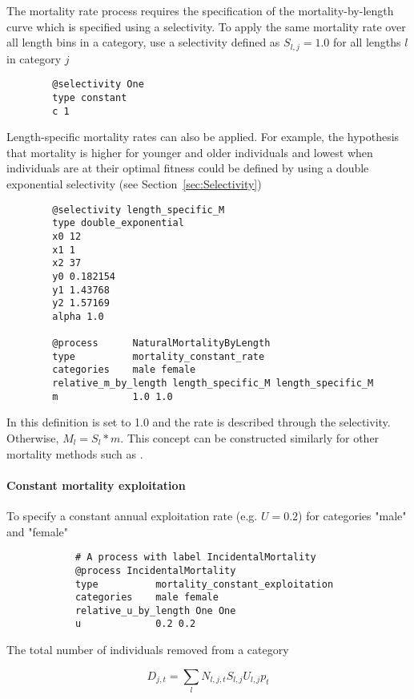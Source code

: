 The mortality rate process requires the specification of the mortality-by-length curve which is specified using a selectivity. To apply the same mortality rate over all length bins in a category, use a selectivity defined as $S_{l,j}=1.0$ for all lengths $l$ in category $j$

{\small{\begin{verbatim}
		@selectivity One
		type constant
		c 1
		\end{verbatim}}}

Length-specific mortality rates can also be applied. For example, the hypothesis that mortality is higher for younger and older individuals and lowest when individuals are at their optimal fitness could be defined by using a double exponential selectivity (see Section~\ref{sec:Selectivity})

{\small{\begin{verbatim}
		@selectivity length_specific_M
		type double_exponential
		x0 12
		x1 1
		x2 37
		y0 0.182154
		y1 1.43768
		y2 1.57169
		alpha 1.0
		
		@process      NaturalMortalityByLength
		type          mortality_constant_rate
		categories    male female
		relative_m_by_length length_specific_M length_specific_M
		m             1.0 1.0
		\end{verbatim}}}


In this definition  is set to 1.0 and the rate is described through the selectivity. Otherwise, $M_{l} = S_{l} * m$. This concept can be constructed similarly for other mortality methods such as .

\paragraph{Constant mortality exploitation}\label{sec:Process-MortalityConstantExploitation} 

To specify a constant annual exploitation rate (e.g. $U=0.2$) for categories "male" and "female"
{\small{\begin{verbatim}
			# A process with label IncidentalMortality
			@process IncidentalMortality
			type          mortality_constant_exploitation
			categories    male female
			relative_u_by_length One One
			u             0.2 0.2
\end{verbatim}}}

The total number of individuals removed from a category

\begin{equation}
	D_{j,t} = \sum_l N_{l,j,t} S_{l,j} U_{l,j} p_t
\end{equation}

